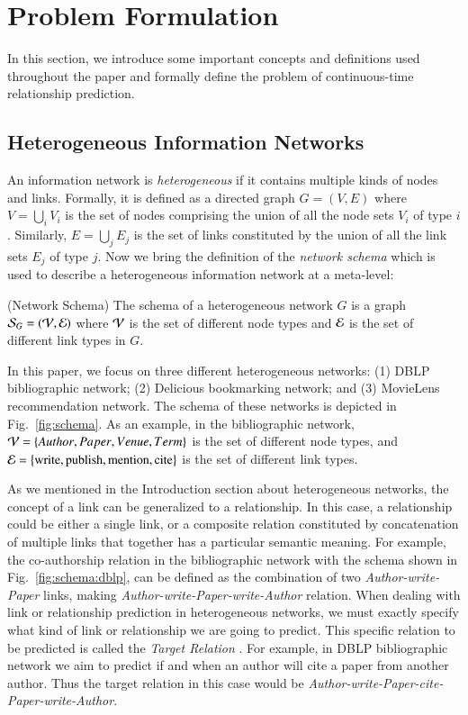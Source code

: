 \section{Problem Formulation}\label{sec:problem}
In this section, we introduce some important concepts and definitions used throughout the paper and formally define the problem of continuous-time relationship prediction.

\subsection{Heterogeneous Information Networks}

An information network is \emph{heterogeneous} if it contains multiple kinds of nodes and links. Formally, it is defined as a directed graph $G=(V,E)$ where $V = \bigcup_i V_i$ is the set of nodes comprising the union of all the node sets $V_i$ of type $i$. Similarly, $E=\bigcup_j E_j$ is the set of links constituted by the union of all the link sets $E_j$ of type $j$. Now we bring the definition of the \emph{network schema} \cite{sun2011pathsim} which is used to describe a heterogeneous information network at a meta-level:

\begin{definition}{(Network Schema)}
	The schema of a heterogeneous network $G$ is a graph $\mathcal{S}_G=(\mathcal{V}, \mathcal{E})$ where $\mathcal{V}$ is the set of different node types and $\mathcal{E}$ is the set of different link types in $G$.
\end{definition}

In this paper, we focus on three different heterogeneous networks: (1) DBLP bibliographic network; (2) Delicious bookmarking network; and (3) MovieLens recommendation network. The schema of these networks is depicted in Fig.~\ref{fig:schema}. As an example, in the bibliographic network, $\mathcal{V}=\left\lbrace {Author}, {Paper}, {Venue}, {Term}\right\rbrace$ is the set of different node types, and $\mathcal{E}=\left\lbrace\text{write}, \text{publish}, \text{mention}, \text{cite}\right\rbrace$ is the set of different link types.

As we mentioned in the Introduction section about heterogeneous networks, the concept of a link can be generalized to a relationship. In this case, a relationship could be either a single link, or a composite relation constituted by concatenation of multiple links that together has a particular semantic meaning. For example, the co-authorship relation in the bibliographic network with the schema shown in Fig.~\ref{fig:schema:dblp}, can be defined as the combination of two \emph{Author-{write}-Paper} links, making \emph{Author-{write}-Paper-{write}-Author} relation. When dealing with link or relationship prediction in heterogeneous networks, we must exactly specify what kind of link or relationship we are going to predict. This specific relation to be predicted is called the \emph{Target Relation} \cite{sun2012will}. For example, in DBLP bibliographic network we aim to predict if and when an author will cite a paper from another author. Thus the target relation in this case would be \emph{Author-{write}-Paper-{cite}-Paper-{write}-Author}.

